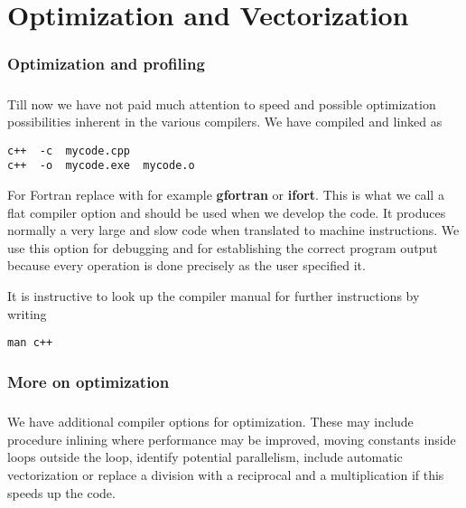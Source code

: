 
\chapter{Optimization and Vectorization}

\subsection*{Optimization and profiling}

\paragraph{}

Till now we have not paid much attention to speed and possible optimization possibilities
inherent in the various compilers. We have compiled and linked as



\begin{verbatim}
c++  -c  mycode.cpp
c++  -o  mycode.exe  mycode.o

\end{verbatim}

For Fortran replace with for example \textbf{gfortran} or \textbf{ifort}.
This is what we call a flat compiler option and should be used when we develop the code.
It produces normally a very large and slow code when translated to machine instructions.
We use this option for debugging and for establishing the correct program output because
every operation is done precisely as the user specified it.

It is instructive to look up the compiler manual for further instructions by writing


\begin{verbatim}
man c++

\end{verbatim}



\subsection*{More on optimization}

\paragraph{}
We have additional compiler options for optimization. These may include procedure inlining where 
performance may be improved, moving constants inside loops outside the loop, 
identify potential parallelism, include automatic vectorization or replace a division with a reciprocal
and a multiplication if this speeds up the code.



